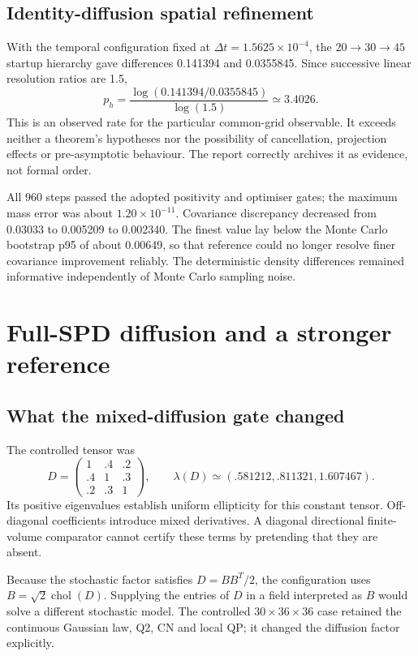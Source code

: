 \section{Identity-diffusion spatial refinement}
With the temporal configuration fixed at $\Delta t=1.5625\times10^{-4}$, the $20\to30\to45$ startup hierarchy gave differences 0.141394 and 0.0355845. Since successive linear resolution ratios are 1.5,
\begin{equation}
 p_h=\frac{\log(0.141394/0.0355845)}{\log(1.5)}\simeq3.4026.
\end{equation}
This is an observed rate for the particular common-grid observable. It exceeds neither a theorem's hypotheses nor the possibility of cancellation, projection effects or pre-asymptotic behaviour. The report correctly archives it as evidence, not formal order.

All 960 steps passed the adopted positivity and optimiser gates; the maximum mass error was about $1.20\times10^{-11}$. Covariance discrepancy decreased from 0.03033 to 0.005209 to 0.002340. The finest value lay below the Monte Carlo bootstrap p95 of about 0.00649, so that reference could no longer resolve finer covariance improvement reliably. The deterministic density differences remained informative independently of Monte Carlo sampling noise.

\chapter{Full-SPD diffusion and a stronger reference}
\section{What the mixed-diffusion gate changed}
The controlled tensor was
\begin{equation}
D=\begin{pmatrix}1&.4&.2\\.4&1&.3\\.2&.3&1\end{pmatrix},\qquad
\lambda(D)\simeq(.581212,.811321,1.607467).
\end{equation}
Its positive eigenvalues establish uniform ellipticity for this constant tensor. Off-diagonal coefficients introduce mixed derivatives. A diagonal directional finite-volume comparator cannot certify these terms by pretending that they are absent.

Because the stochastic factor satisfies $D=BB^T/2$, the configuration uses $B=\sqrt2\operatorname{chol}(D)$. Supplying the entries of $D$ in a field interpreted as $B$ would solve a different stochastic model. The controlled $30\times36\times36$ case retained the continuous Gaussian law, Q2, CN and local QP; it changed the diffusion factor explicitly.

